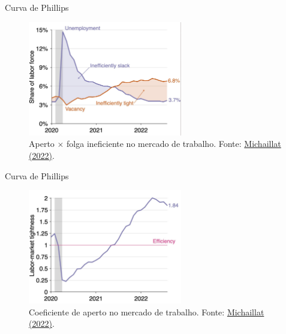 \documentclass[10pt]{beamer}
\begin{document}
\begin{frame}{Curva de Phillips}
    \begin{figure}
        \centering
        \includegraphics[width=0.6\textwidth]{./figures/aula8_fig6.PNG}
        \caption{Aperto $\times$ folga ineficiente no mercado de trabalho. Fonte: \href{https://pmichaillat.substack.com/p/the-us-labor-market-continues-to}{Michaillat (2022)}.}
        \label{fig:uv}
    \end{figure}
\end{frame}

\begin{frame}{Curva de Phillips}
    \begin{figure}
        \centering
        \includegraphics[width=0.6\textwidth]{./figures/aula8_fig7.PNG}
        \caption{Coeficiente de aperto no mercado de trabalho. Fonte: \href{https://pmichaillat.substack.com/p/the-us-labor-market-continues-to}{Michaillat (2022)}.}
        \label{fig:uv}
    \end{figure}
\end{frame}
\end{document}

